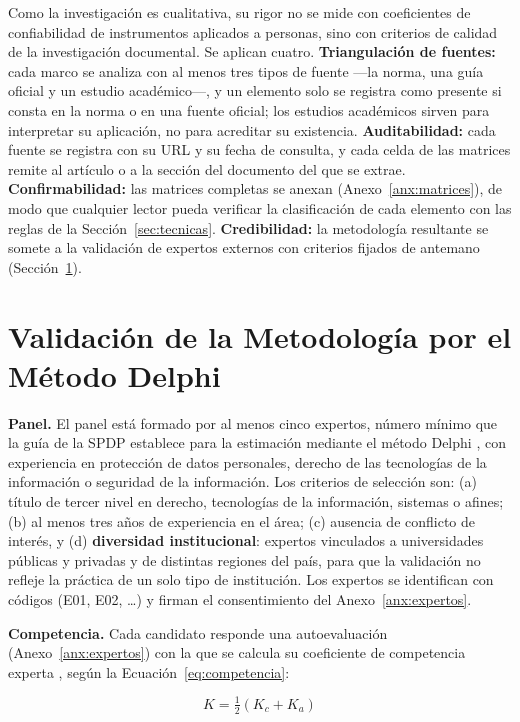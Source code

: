 Como la investigación es cualitativa, su rigor no se mide con coeficientes de confiabilidad de instrumentos aplicados a personas, sino con criterios de calidad de la investigación documental. Se aplican cuatro. \textbf{Triangulación de fuentes:} cada marco se analiza con al menos tres tipos de fuente ---la norma, una guía oficial y un estudio académico---, y un elemento solo se registra como presente si consta en la norma o en una fuente oficial; los estudios académicos sirven para interpretar su aplicación, no para acreditar su existencia. \textbf{Auditabilidad:} cada fuente se registra con su URL y su fecha de consulta, y cada celda de las matrices remite al artículo o a la sección del documento del que se extrae. \textbf{Confirmabilidad:} las matrices completas se anexan (Anexo~\ref{anx:matrices}), de modo que cualquier lector pueda verificar la clasificación de cada elemento con las reglas de la Sección~\ref{sec:tecnicas}. \textbf{Credibilidad:} la metodología resultante se somete a la validación de expertos externos con criterios fijados de antemano (Sección~\ref{sec:validacion_delphi}).

\section{Validación de la Metodología por el Método Delphi}
\label{sec:validacion_delphi}

\textbf{Panel.} El panel está formado por al menos cinco expertos, número mínimo que la guía de la SPDP establece para la estimación mediante el método Delphi \cite{spdp2026guiav2}, con experiencia en protección de datos personales, derecho de las tecnologías de la información o seguridad de la información. Los criterios de selección son: (a) título de tercer nivel en derecho, tecnologías de la información, sistemas o afines; (b) al menos tres años de experiencia en el área; (c) ausencia de conflicto de interés, y (d) \textbf{diversidad institucional}: expertos vinculados a universidades públicas y privadas y de distintas regiones del país, para que la validación no refleje la práctica de un solo tipo de institución. Los expertos se identifican con códigos (E01, E02, \ldots) y firman el consentimiento del Anexo~\ref{anx:expertos}.

\textbf{Competencia.} Cada candidato responde una autoevaluación (Anexo~\ref{anx:expertos}) con la que se calcula su coeficiente de competencia experta \cite{cabero2013competencia}, según la Ecuación~\ref{eq:competencia}:

\begin{equation}
\label{eq:competencia}
K = \tfrac{1}{2}\left(K_c + K_a\right)
\end{equation}

